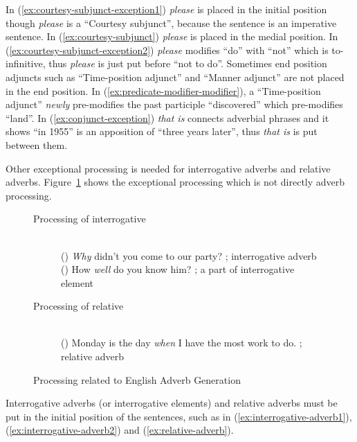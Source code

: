 In (\ref{ex:courtesy-subjunct-exception1}) {\em please} is placed in 
the initial position though {\em please} is a ``Courtesy subjunct'', because
the sentence is an imperative sentence. In (\ref{ex:courtesy-subjunct}) 
{\em please} is placed in the medial position.
In (\ref{ex:courtesy-subjunct-exception2}) {\em please} modifies ``do'' 
with ``not'' which is to-infinitive, thus {\em please} is just put before 
``not to do''. 
Sometimes end position adjuncts such as ``Time-position adjunct'' and 
``Manner adjunct'' are not placed in the end position.
In (\ref{ex:predicate-modifier-modifier}), a ``Time-position adjunct'' 
{\em newly} pre-modifies the past participle ``discovered'' which
pre-modifies ``land''.
In (\ref{ex:conjunct-exception}) {\em that is} connects adverbial phrases 
and it shows ``in 1955'' is an apposition of ``three years later'', thus 
{\em that is} is put between them.

Other exceptional processing is needed for interrogative adverbs and 
relative adverbs. Figure~\ref{fig:related-processing} shows 
the exceptional processing which is not directly adverb processing.

\begin{singlespace}
\begin{figure}[t]
    \leavevmode
    \small    
 \begin{description}
  \item [Processing of interrogative] \mbox{} \\
    ()
    {\em Why} didn't you come to our party? ; interrogative adverb \\
    ()
    How {\em well} do you know him?         ; a part of interrogative element
  \item [Processing of relative] \mbox{} \\
    ()
    Monday is the day {\em when} I have the most work to do. ; relative adverb
 \end{description}
    \caption{Processing related to English Adverb Generation}
    \label{fig:related-processing}
\end{figure}
\end{singlespace}

Interrogative adverbs (or interrogative elements) and relative adverbs must 
be put in the initial position of the sentences, such as in
(\ref{ex:interrogative-adverb1}), (\ref{ex:interrogative-adverb2}) and
(\ref{ex:relative-adverb}).

